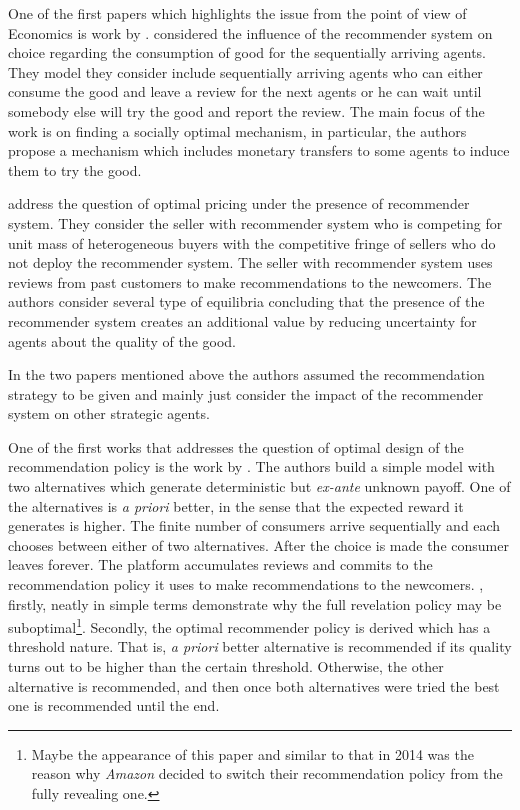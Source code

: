 \documentclass[a4paper]{article}
\begin{document}
	One of the first papers which highlights the issue from the point of view of Economics is work by \cite{avery1999market}. \cite{avery1999market} considered the influence of the recommender system on choice regarding the consumption of good for the sequentially arriving agents. They model they consider include sequentially arriving agents who can either consume the good and leave a review for the next agents or he can wait until somebody else will try the good and report the review. The main focus of the work is on finding a socially optimal mechanism, in particular, the authors propose a mechanism which includes monetary transfers to some agents to induce them to try the good.   
		
		
		
	\cite{bergemann2006optimal} address the question of optimal pricing under the presence of recommender system. They consider the seller with recommender system who is competing for unit mass of heterogeneous buyers with the competitive fringe of sellers who do not deploy the recommender system. The seller with recommender system uses reviews from past customers to make recommendations to the newcomers. The authors consider several type of equilibria concluding that the presence of the recommender system creates an additional value by reducing uncertainty for agents about the quality of the good.
	
	
	In the two papers mentioned above the authors assumed the recommendation strategy to be given and mainly just consider the impact of the recommender system on other strategic agents. 
	
	
	
	One of the first works that addresses the question of optimal design of the recommendation policy is the work by \cite{kremer2014}. The authors build a simple model with two alternatives which generate deterministic but \textit{ex-ante} unknown payoff. One of the alternatives is \textit{a priori} better, in the sense that the expected reward it generates is higher. The finite number of consumers arrive sequentially and each chooses between either of two alternatives. After the choice is made the consumer leaves forever. The platform accumulates reviews and commits to the recommendation policy it uses to make recommendations to the newcomers. \cite{kremer2014}, firstly, neatly in simple terms demonstrate why the full revelation policy may be suboptimal\footnote{Maybe the appearance of this paper and similar to that in 2014 was the reason why \textit{Amazon} decided to switch their recommendation policy from the fully revealing one.}. Secondly, the optimal recommender policy is derived which has a threshold nature. That is, \textit{a priori} better alternative is recommended if its quality turns out to be higher than the certain threshold. Otherwise, the other alternative is recommended, and then once both alternatives were tried the best one is recommended until the end. 
	
\end{document}
